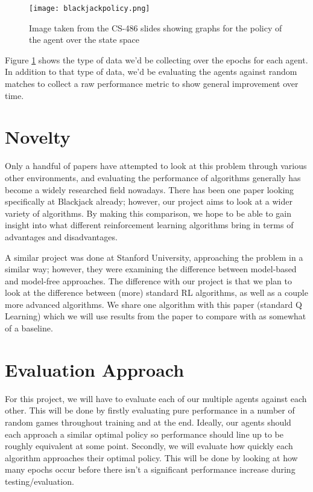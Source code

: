 \documentclass[letterpaper]{article}
\begin{document}
 \begin{figure}[ht!]
     \centering
     \texttt{[image: blackjackpolicy.png]}
     \caption{Image taken from the CS-486 slides showing graphs for the policy of the agent over the state space}
     \label{fig:policy}
 \end{figure}

 Figure \ref{fig:policy} shows the type of data we'd be collecting over the epochs for each agent. In addition to that type of data, we'd be evaluating the agents against random matches to collect a raw performance metric to show general improvement over time.

 \section*{Novelty}
 Only a handful of papers have attempted to look at this problem through various other environments, and evaluating the performance of algorithms generally has become a widely researched field nowadays. There has been one paper looking specifically at Blackjack already; however, our project aims to look at a wider variety of algorithms. By making this comparison, we hope to be able to gain insight into what different reinforcement learning algorithms bring in terms of advantages and disadvantages.

 A similar project was done at Stanford University, approaching the problem in a similar way; however, they were examining the difference between model-based and model-free approaches. The difference with our project is that we plan to look at the difference between (more) standard RL algorithms, as well as a couple more advanced algorithms. We share one algorithm with this paper (standard Q Learning) which we will use results from the paper to compare with as somewhat of a baseline.

 \section*{Evaluation Approach}
 For this project, we will have to evaluate each of our multiple agents against each other. This will be done by firstly evaluating pure performance in a number of random games throughout training and at the end. Ideally, our agents should each approach a similar optimal policy so performance should line up to be roughly equivalent at some point. Secondly, we will evaluate how quickly each algorithm approaches their optimal policy. This will be done by looking at how many epochs occur before there isn't a significant performance increase during testing/evaluation.
\end{document}
